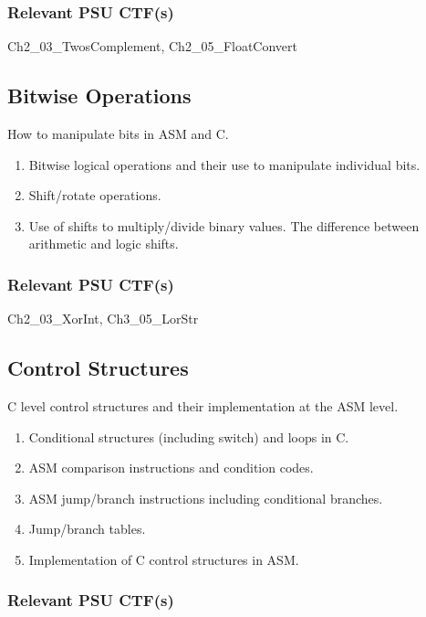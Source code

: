 \documentclass[12pt,letterpaper]{article}
\begin{document}
	\subsubsection*{Relevant PSU CTF(s)}

	Ch2\_03\_TwosComplement, Ch2\_05\_FloatConvert


	\subsection{Bitwise Operations}

	How to manipulate bits in ASM and C.

	\begin{enumerate}
		\item Bitwise logical operations and their use to manipulate individual bits.
		\item Shift/rotate operations.
		\item Use of shifts to multiply/divide binary values. The difference between arithmetic and logic shifts.
	\end{enumerate}
	
	\subsubsection*{Relevant PSU CTF(s)}

	Ch2\_03\_XorInt, Ch3\_05\_LorStr


	\subsection{Control Structures}

	C level control structures and their implementation at the ASM level.

	\begin{enumerate}
		\item Conditional structures (including switch) and loops in C.
		\item ASM comparison instructions and condition codes.
		\item ASM jump/branch instructions including conditional branches.
		\item Jump/branch tables.
		\item Implementation of C control structures in ASM.
	\end{enumerate}

	\subsubsection*{Relevant PSU CTF(s)}
\end{document}
